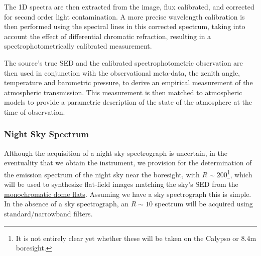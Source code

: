 The 1D spectra are then extracted from the image, flux calibrated, and corrected for second order light contamination. A more precise wavelength calibration is then performed using the spectral lines in this corrected spectrum, taking into account the effect of differential chromatic refraction, resulting in a spectrophotometrically calibrated measurement.

The source's true SED and the calibrated spectrophotometric observation are then used in conjunction with the observational meta-data, \eg the zenith angle, temperature and barometric pressure, to derive an empirical measurement of the atmospheric transmission. This measurement is then matched to atmospheric models to provide a parametric description of the state of the atmosphere at the time of observation.


%


 
\subsubsection{Night Sky Spectrum}\label{sec:CPP:aux:nightSkySpectrum}
Although the acquisition of a night sky spectrograph is uncertain, in the eventuality that we obtain the instrument, we provision for the determination of the emission spectrum of the night sky near the \auxtelescope boresight, with $R \sim 200$\footnote{It is not entirely clear yet whether these will be taken on the Calypso or 8.4m boresight.}, which will be used to synthesize flat-field images matching the sky's SED from the \hyperref[sec:CPP:output:monoFlat]{monochromatic dome flats}.
\alg Assuming we have a sky spectrograph this is simple. In the absence of a sky spectrograph, an $R \sim 10$ spectrum will be acquired using standard/narrowband filters.








